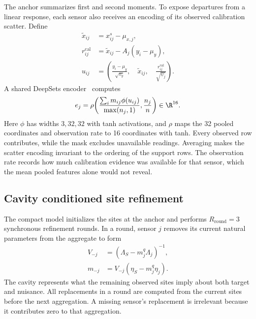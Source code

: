 The anchor summarizes first and second moments. To expose departures from a linear response, each sensor also receives an encoding of its observed calibration scatter. Define
\begin{equation}
  \begin{aligned}
  \widetilde x_{ij}&=x^{s}_{ij}-\mu_{x,j},\\
  r^{\mathrm{cal}}_{ij}&=\widetilde x_{ij}-A_j(y_i-\mu_y),\\
  u_{ij}&=\left(
   \frac{y_i-\mu_y}{\sqrt{v_y}},\quad
   \widetilde x_{ij},\quad
   \frac{r^{\mathrm{cal}}_{ij}}{\sqrt{\psi_j}}
   \right).
  \end{aligned}
  \label{meth:scatter}
\end{equation}
A shared DeepSets encoder~\citep{zaheer2017deepsets} computes
\begin{equation}
  e_j=\rho\!\left(
    \frac{\sum_i m_{ij}\phi(u_{ij})}{\max(n_j,1)},\frac{n_j}{n}
    \right)\in\R^{16}.
  \label{meth:encoder}
\end{equation}
Here $\phi$ has widths $3,32,32$ with tanh activations, and $\rho$ maps the 32 pooled coordinates and observation rate to 16 coordinates with tanh. Every observed row contributes, while the mask excludes unavailable readings. Averaging makes the scatter encoding invariant to the ordering of the support rows. The observation rate records how much calibration evidence was available for that sensor, which the mean pooled features alone would not reveal.

\subsection{Cavity conditioned site refinement}

The compact model initializes the sites at the anchor and performs $R_{\mathrm{round}}=3$ synchronous refinement rounds. In a round, sensor $j$ removes its current natural parameters from the aggregate to form
\begin{equation}
  \begin{aligned}
  V_{-j}&=(\Lambda_S-m^q_j\Lambda_j)^{-1},\\
  m_{-j}&=V_{-j}(\eta_S-m^q_j\eta_j).
  \end{aligned}
  \label{meth:cavity}
\end{equation}
The cavity represents what the remaining observed sites imply about both target and nuisance. All replacements in a round are computed from the current sites before the next aggregation. A missing sensor's replacement is irrelevant because it contributes zero to that aggregation.

